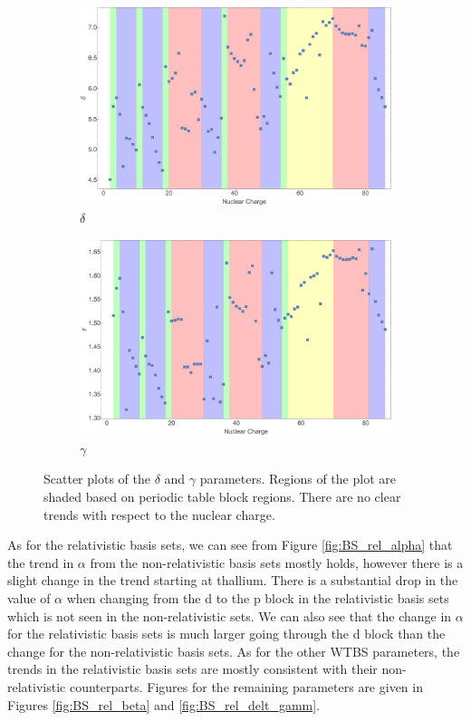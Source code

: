 \begin{figure}
\centering
\begin{subfigure}[b]{0.49\textwidth}
	\includegraphics[width=\textwidth]{Figures/BS_non_rel_delta.png}
	\caption{$\delta$}
\end{subfigure}
\begin{subfigure}[b]{0.49\textwidth}
	\includegraphics[width=\textwidth]{Figures/BS_non_rel_gamma.png}
	\caption{$\gamma$}
\end{subfigure}	
\caption[Scatter plots of the $\delta$ and $\gamma$ parameters.]{Scatter plots of the $\delta$ and $\gamma$ parameters. Regions of the plot are shaded based on periodic table block regions. There are no clear trends with respect to the nuclear charge.}
\label{fig:BS_non_rel_delt_gamm}
\end{figure}

As for the relativistic basis sets, we can see from Figure \ref{fig:BS_rel_alpha} that the trend in $\alpha$ from the non-relativistic basis sets mostly holds, however there is a slight change in the trend starting at thallium. There is a substantial drop in the value of $\alpha$ when changing from the d to the p block in the relativistic basis sets which is not seen in the non-relativistic sets. We can also see that the change in $\alpha$ for the relativistic basis sets is much larger going through the d block than the change for the non-relativistic basis sets. As for the other WTBS parameters, the trends in the relativistic basis sets are mostly consistent with their non-relativistic counterparts. Figures for the remaining parameters are given in Figures \ref{fig:BS_rel_beta} and \ref{fig:BS_rel_delt_gamm}.

